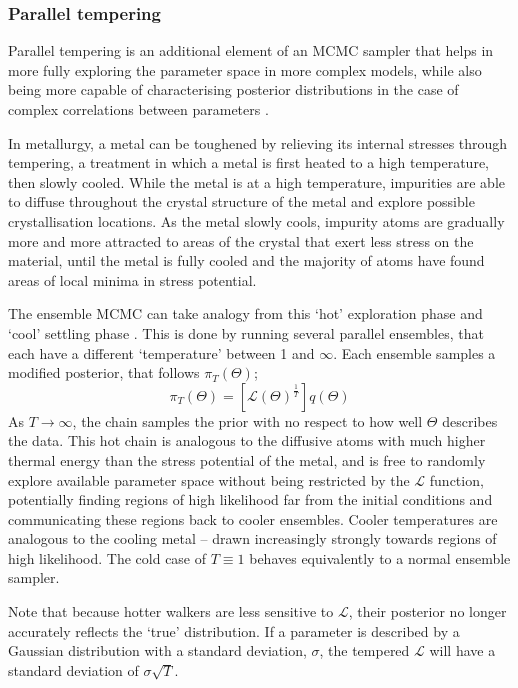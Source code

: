 \subsubsection{Parallel tempering}
\label{sect:modelling:parallel tempering}

Parallel tempering is an additional element of an MCMC sampler that helps in more fully exploring the parameter space in more complex models, while also being more capable of characterising posterior distributions in the case of complex correlations between parameters \citep{earl2005}.

In metallurgy, a metal can be toughened by relieving its internal stresses through tempering, a treatment in which a metal is first heated to a high temperature, then slowly cooled.
While the metal is at a high temperature, impurities are able to diffuse throughout the crystal structure of the metal and explore possible crystallisation locations. As the metal slowly cools, impurity atoms are gradually more and more attracted to areas of the crystal that exert less stress on the material, until the metal is fully cooled and the majority of atoms have found areas of local minima in stress potential.

The ensemble MCMC can take analogy from this `hot' exploration phase and `cool' settling phase \citep{earl2005}. This is done by running several parallel ensembles, that each have a different `temperature' between 1 and $\infty$. Each ensemble samples a modified posterior, that follows $\pi_T(\Theta)$;
\begin{equation}
    \pi_T(\Theta) = [\mathcal{L}(\Theta)^\frac{1}{T}] q(\Theta)
\end{equation}
As $T \rightarrow \infty$, the chain samples the prior with no respect to how well $\Theta$ describes the data. This hot chain is analogous to the diffusive atoms with much higher thermal energy than the stress potential of the metal, and is free to randomly explore available parameter space without being restricted by the $\mathcal{L}$ function, potentially finding regions of high likelihood far from the initial conditions and communicating these regions back to cooler ensembles. Cooler temperatures are analogous to the cooling metal -- drawn increasingly strongly towards regions of high likelihood.
The cold case of $T \equiv 1$ behaves equivalently to a normal ensemble sampler.

Note that because hotter walkers are less sensitive to $\mathcal{L}$, their posterior no longer accurately reflects the `true' distribution. If a parameter is described by a Gaussian distribution with a standard deviation, $\sigma$, the tempered $\mathcal{L}$ will have a standard deviation of $\sigma \sqrt{T}$.

